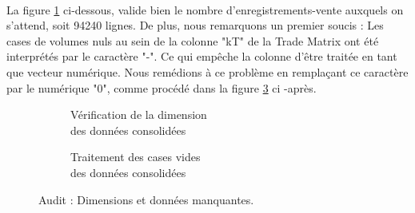 \paragraph{}
		La figure \ref{fig:size} ci-dessous, valide bien le nombre d'enregistrements-vente auxquels on s'attend, soit 94240 lignes. De plus, nous remarquons un premier soucis : Les cases de volumes nuls au sein de la colonne "kT" de la Trade Matrix ont été interprétés par le caractère "-". Ce qui empêche la colonne d'être traitée en tant que vecteur numérique. Nous remédions à ce problème en remplaçant ce caractère par le numérique "0", comme procédé dans la figure \ref{fig:nas} ci -après.
		\newline
			\begin{figure}[H]
			\begin{subfigure}{.5\textwidth}
				\centering
				\caption{Vérification de la dimension\\des données consolidées}
				\label{fig:size}
			\end{subfigure}
			\begin{subfigure}{.5\textwidth}
					\centering
					\caption{Traitement des cases vides\\des données consolidées}
					\label{fig:nas}
			\end{subfigure}
			\caption{Audit : Dimensions et données manquantes.}
				\end{figure}
				
